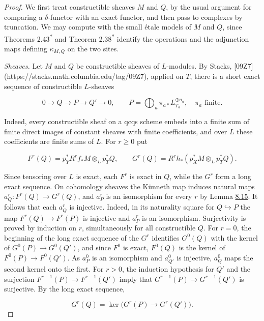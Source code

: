 \documentclass[11pt]{article}
\newcommand{\bpout}[1]{#1\textsuperscript{\hyperlink{bp-outside}{\ensuremath{\ast}}}}
\begin{document}
\begin{proof}[{Proof}]\label{bp60}%
We first treat constructible sheaves \(M\) and \(Q\), by the usual argument for comparing a \(\delta\)-functor with an exact functor, and then pass to complexes by truncation. We may compute with the small étale models of \(M\) and \(Q\), since Theorems \bpout{2.43} and \bpout{Theorem 2.38} identify the operations and the adjunction maps defining \(\kappa_{M,Q}\) on the two sites.

\emph{Sheaves.} Let \(M\) and \(Q\) be constructible sheaves of \(L\)-modules. By Stacks, [09Z7](https://stacks.math.columbia.edu/tag/09Z7), applied on \(T\), there is a short exact sequence of constructible \(L\)-sheaves

\[
0\longrightarrow Q\longrightarrow P\longrightarrow Q'\longrightarrow0,
\qquad
P=\bigoplus_a\pi_{a*}L_{T_a}^{\oplus n_a},
\quad \pi_a\text{ finite}.
\]

Indeed, every constructible sheaf on a qcqs scheme embeds into a finite sum of finite direct images of constant sheaves with finite coefficients, and over \(L\) these coefficients are finite sums of \(L\). For \(r\geq0\) put

\[
F^r(Q)=p_Y^*R^rf_*M\otimes_Lp_T^*Q,
\qquad
G^r(Q)=R^rh_*(p_X^*M\otimes_Lp_T^*Q).
\]

Since tensoring over \(L\) is exact, each \(F^r\) is exact in \(Q\), while the \(G^r\) form a long exact sequence. On cohomology sheaves the Künneth map induces natural maps \(a_Q^r:F^r(Q)\to G^r(Q)\), and \(a_P^r\) is an isomorphism for every \(r\) by Lemma \hyperref[bp56]{8.15}. It follows that each \(a_Q^r\) is injective. Indeed, in its naturality square for \(Q\hookrightarrow P\) the map \(F^r(Q)\to F^r(P)\) is injective and \(a_P^r\) is an isomorphism. Surjectivity is proved by induction on \(r\), simultaneously for all constructible \(Q\). For \(r=0\), the beginning of the long exact sequence of the \(G^r\) identifies \(G^0(Q)\) with the kernel of \(G^0(P)\to G^0(Q')\), and since \(F^0\) is exact, \(F^0(Q)\) is the kernel of \(F^0(P)\to F^0(Q')\). As \(a_P^0\) is an isomorphism and \(a_{Q'}^0\) is injective, \(a^0_Q\) maps the second kernel onto the first. For \(r>0\), the induction hypothesis for \(Q'\) and the surjection \(F^{r-1}(P)\to F^{r-1}(Q')\) imply that \(G^{r-1}(P)\to G^{r-1}(Q')\) is surjective. By the long exact sequence,

\[
G^r(Q)=\ker\bigl(G^r(P)\to G^r(Q')\bigr).
\]


\end{proof}
\end{document}
